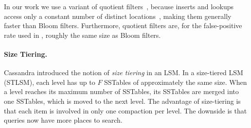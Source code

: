 
In our work we use a variant of quotient
filters~\cite{DBLP:journals/pvldb/BenderFJKKMMSSZ12}, because inserts and
lookups access only a constant number of distinct
locations~\cite{DBLP:journals/pvldb/BenderFJKKMMSSZ12}, making them generally
faster than Bloom filters.  Furthermore, quotient filters are, for the
false-positive rate used in \sysname, roughly the same size as Bloom filters.





\paragraph{Size Tiering.} Cassandra introduced the notion of \emph{size
tiering} in an LSM.  In a size-tiered LSM (STLSM), each level has up
to $F$ SSTables of approximately the same size.  When a level
reaches its maximum number of SSTables, its SSTables are merged into
one SSTables, which is moved to the next level.
The advantage of size-tiering is that each item is involved in only
one compaction per level.  The downside is that queries now have
more places to search.


